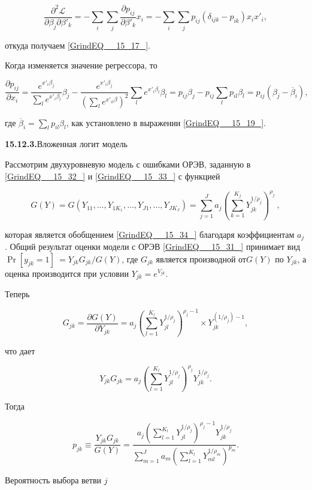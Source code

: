 \[\frac{{\partial }^2{\mathcal L}}{\partial {\beta }_j\partial {\beta }'_k}=-\sum_i{\sum_j{\frac{\partial p_{ij}}{\partial {\beta }'_k}x_i=-\sum_i{\sum_j{p_{ij}\left({\delta }_{ijk}-p_{ik}\right)x_ix'_i}}}},\] 

откуда получаем \eqref{GrindEQ__15_17_}.

Когда изменяется значение регрессора, то

\[\frac{\partial p_{ij}}{\partial x_i}=\frac{e^{x'_i{\beta }_j}}{\sum_l{e^{x'_i{\beta }_l}}}{\beta }_j-\frac{e^{x'_i{\beta }_j}}{{\left(\sum_l{e^{x'_{il}\beta }}\right)}^2}\sum_l{e^{x'_i{\beta }_l}}{\beta }_l=p_{ij}{\beta }_j-p_{ij}\sum_l{p_{il}{\beta }_l}=p_{ij}\left({\beta }_j-{\overline{\beta }}_i\right),\] 

где ${\overline{\beta }}_i=\sum_l{p_{il}{\beta }_l}$, как установлено в выражении \eqref{GrindEQ__15_19_}.

\textbf{15.12.3.}Вложенная логит модель

Рассмотрим двухуровневую модель с ошибками ОРЭВ, заданную в \eqref{GrindEQ__15_32_} и \eqref{GrindEQ__15_33_} с функцией

\[G\left(Y\right)=G\left(Y_{11},\dots ,Y_{1K_1},\dots ,Y_{J1},\dots ,Y_{JK_J}\right)=\sum^J_{j=1}{a_j{\left(\sum^{K_j}_{k=1}{Y^{{1}/{{\rho }_j}}_{jk}}\right)}^{{\rho }_j}\ ,}\] 

которая является обобщением \eqref{GrindEQ__15_34_} благодаря коэффициентам $a_j$. Общий результат оценки модели с ОРЭВ \eqref{GrindEQ__15_31_} принимает вид ${\Pr  \left[y_{jk}=1\right]\ }={Y_{jk}G_{jk}}/{G(Y)}$, где $G_{jk}$ является производной от$G(Y)$ по $Y_{jk}$, а оценка производится при условии $Y_{jk}=e^{V_{jk}}$.

Теперь 

\[G_{jk}=\frac{\partial G\left(Y\right)}{\partial Y_{jk}}={a_j\left(\sum^{K_l}_{l=1}{Y^{{1}/{{\rho }_j}}_{jl}}\right)}^{{\rho }_j-1}\times Y^{\left({1}/{{\rho }_j}\right)-1}_{jk},\] 

что дает

\[Y_{jk}G_{jk}=a_j{\left(\sum^{K_l}_{l=1}{Y^{{1}/{{\rho }_j}}_{jl}}\right)}^{{\rho }_j}Y^{{1}/{{\rho }_j}}_{jk}.\] 

Тогда 

\[p_{jk}\equiv \frac{Y_{jk}G_{jk}}{G\left(Y\right)}=\frac{a_j{\left(\sum^{K_l}_{l=1}{Y^{{1}/{{\rho }_j}}_{jl}}\right)}^{{\rho }_j-1}Y^{{1}/{{\rho }_j}}_{jk}}{{\sum^J_{m=1}{a_m\left(\sum^{K_l}_{l=1}{Y^{{1}/{{\rho }_m}}_{ml}}\right)}}^{p_m}}.\] 

Вероятность выбора ветви $j$


